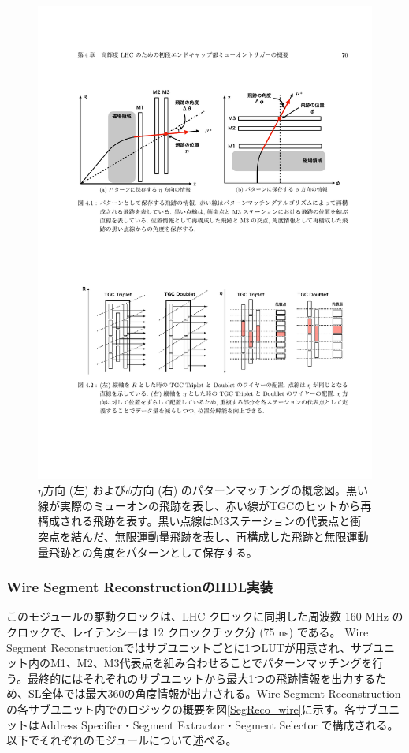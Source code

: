 \begin{figure} 
\centering
\includegraphics[width=16cm]{fig/SL/Concept_segment.pdf}
\caption[Segment Reconstructionのコンセプト]{$\eta$方向 (左) および$\phi$方向 (右) のパターンマッチングの概念図\cite{mt_mino}。黒い線が実際のミューオンの飛跡を表し、赤い線がTGCのヒットから再構成される飛跡を表す。黒い点線はM3ステーションの代表点と衝突点を結んだ、無限運動量飛跡を表し、再構成した飛跡と無限運動量飛跡との角度をパターンとして保存する。}
\label{Concept_segment}
\end{figure}

\subsubsection*{Wire Segment ReconstructionのHDL実装}
このモジュールの駆動クロックは、LHC クロックに同期した周波数 160 MHz のクロックで、レイテンシーは 12 クロックチック分 (75 ns) である。
Wire Segment Reconstructionではサブユニットごとに1つLUTが用意され、サブユニット内のM1、M2、M3代表点を組み合わせることでパターンマッチングを行う。最終的にはそれぞれのサブユニットから最大1つの飛跡情報を出力するため、SL全体では最大360の角度情報が出力される。Wire Segment Reconstructionの各サブユニット内でのロジックの概要を図\ref{SegReco_wire}に示す。各サブユニットはAddress Specifier・Segment Extractor・Segment Selector で構成される。以下でそれぞれのモジュールについて述べる。

